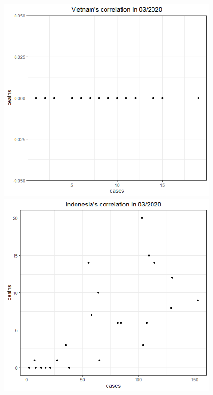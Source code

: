 \documentclass[a4paper]{article}
\theoremstyle{definition}
\begin{document}
\begin{enumerate}[1)]
\begin{figure}[H]
\begin{center}
        \includegraphics[scale = 0.3]{ix/ix.2/VN_03_2020.png}
        \includegraphics[scale = 0.3]{ix/ix.2/IDN_03_2020.png}

\end{center}
\end{figure}
\end{enumerate}
\end{document}

